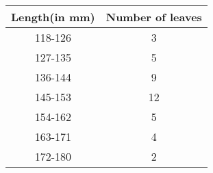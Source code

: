 ﻿
    \begin{tabular}{|c|c|}
        \hline
        Length(in mm) & Number of leaves \\ \hline
        118-126       & 3                \\ \hline
        127-135       & 5                \\ \hline
        136-144       & 9                \\ \hline
        145-153       & 12               \\ \hline
        154-162       & 5                \\ \hline
        163-171       & 4                \\ \hline
        172-180       & 2                \\ \hline
    \end{tabular}
